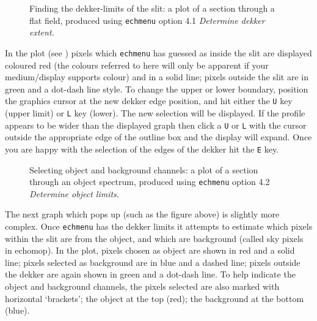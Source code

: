 \begin{figure}
\begin{center}
{\leavevmode\epsfysize=136mm}

\parbox{140mm}{
\caption{Finding the dekker-limits of the slit: a plot of a section through
a flat field, produced using {\tt echmenu} option 4.1 {\sl Determine dekker
extent.}}
\label{fi_dekker_limits}
}
\end{center}
\end{figure}

In the plot (see )
pixels which \verb+echmenu+ has guessed as inside the slit are
displayed coloured
red
{(the colours referred to here will only be apparent if your
medium/display supports colour)}
and in a solid line; pixels outside the slit
are in green and a dot-dash line style.  To change the upper or lower
boundary, position the graphics cursor at the new dekker edge position,
and hit either the \verb+U+ key (upper limit) or \verb+L+ key (lower).
The new selection will be displayed.  If the profile appears to be wider
than the displayed graph then click a \verb+U+ or \verb+L+ with the
cursor outside the appropriate edge of the outline box and the display
will expand.  Once you are happy with the selection of the edges of
the dekker hit the \verb+E+ key.

\begin{htmlonly}
\begin{figure}
\begin{center}
\leavevmode\epsfysize=136mm

\parbox{140mm}{
\caption{Selecting object and background channels: a plot of a section
through an object spectrum, produced using {\tt echmenu} option 4.2
{\sl Determine object limits.}
}
\label{fi_channel_select_again}
}
\end{center}
\end{figure}
\end{htmlonly}

The next graph which pops up (such as
{the figure above}) is slightly more complex.  Once \verb+echmenu+ has the
dekker limits it attempts to estimate which pixels within the slit are from
the object, and which are background (called sky pixels in {\sc echomop})\@.
In the plot, pixels chosen as object are shown in red and a solid line;
pixels selected as background are in blue and a dashed line;
pixels outside the dekker are again shown in green and a dot-dash line.
To help indicate the object and background channels, the pixels selected
are also marked with horizontal `brackets'; the object at the top (red);
the background at the bottom (blue).

